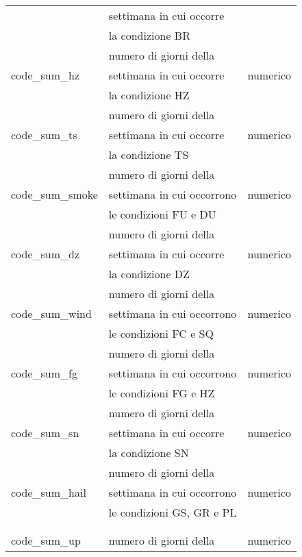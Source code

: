 \begin{longtable}{lll}
	& settimana in cui occorre & \\ 
	& la condizione BR & \\ \hline	
	\multirow{3}{*}{code\_sum\_hz}	& numero di giorni della	 &  	 
	\multirow{3}{*}{numerico} \\
	& settimana in cui occorre & \\ 	 
	& la condizione HZ & \\ \hline
	\multirow{3}{*}{code\_sum\_ts}	& numero di giorni della	 & 	 
	\multirow{3}{*}{numerico} \\
	& settimana in cui occorre & \\  	 
	& la condizione TS & \\ \hline
	\multirow{3}{*}{code\_sum\_smoke}	& numero di giorni della & 	 
	\multirow{3}{*}{numerico} \\
	& settimana in cui occorrono & \\ 
	& le condizioni FU e DU & \\ \hline
	\multirow{3}{*}{code\_sum\_dz}	& numero di giorni della	 & 		
	\multirow{3}{*}{numerico} \\
	& settimana in cui occorre & \\ 	 
	& la condizione DZ & \\ \hline
	\multirow{3}{*}{code\_sum\_wind}	& numero di giorni della &	 	 
	\multirow{3}{*}{numerico} \\
	& settimana in cui occorrono & \\ 
	& le condizioni FC e SQ & \\ \hline
	\multirow{3}{*}{code\_sum\_fg}	& numero di giorni della	 &		
	\multirow{3}{*}{numerico} \\
	& settimana in cui occorrono & \\  	 
	& le condizioni FG e HZ & \\ \hline
	\multirow{3}{*}{code\_sum\_sn}	& numero di giorni della	 & 		
	\multirow{3}{*}{numerico} \\
	& settimana in cui occorre & \\ 	 
	& la condizione SN & \\ \hline
	\multirow{3}{*}{code\_sum\_hail}	& numero di giorni della & 
	\multirow{3}{*}{numerico} \\
	& settimana in cui occorrono & \\ 
	& le condizioni GS, GR e PL & \\ \hline
	\\\\ \hline
	\multirow{3}{*}{code\_sum\_up}	& numero di giorni della	 & 
	\multirow{3}{*}{numerico} \\

\end{longtable}
